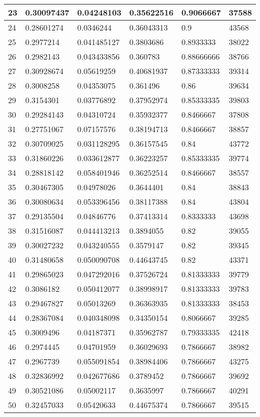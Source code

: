 \begin{longtable}{|l|l|l|l|l|l|}
23 & 0.30097437 & 0.04248103 & 0.35622516 & 0.9066667 & 37588 \\ \hline 
24 & 0.28601274 & 0.0346244 & 0.36043313 & 0.9 & 43568 \\ \hline 
25 & 0.2977214 & 0.041485127 & 0.3803686 & 0.8933333 & 38022 \\ \hline 
26 & 0.2982143 & 0.043433856 & 0.360783 & 0.88666666 & 38766 \\ \hline 
27 & 0.30928674 & 0.05619259 & 0.40681937 & 0.87333333 & 39314 \\ \hline 
28 & 0.3008258 & 0.04353075 & 0.361496 & 0.86 & 39634 \\ \hline 
29 & 0.3154301 & 0.03776892 & 0.37952974 & 0.85333335 & 39803 \\ \hline 
30 & 0.29284143 & 0.04310724 & 0.35932377 & 0.8466667 & 37808 \\ \hline 
31 & 0.27751067 & 0.07157576 & 0.38194713 & 0.8466667 & 38857 \\ \hline 
32 & 0.30709025 & 0.031128295 & 0.36157545 & 0.84 & 43772 \\ \hline 
33 & 0.31860226 & 0.033612877 & 0.36223257 & 0.85333335 & 39774 \\ \hline 
34 & 0.28818142 & 0.058401946 & 0.36252514 & 0.8466667 & 38557 \\ \hline 
35 & 0.30467305 & 0.04978026 & 0.3644401 & 0.84 & 38843 \\ \hline 
36 & 0.30080634 & 0.053396456 & 0.38117388 & 0.84 & 43804 \\ \hline 
37 & 0.29135504 & 0.04846776 & 0.37413314 & 0.8333333 & 43698 \\ \hline 
38 & 0.31516087 & 0.044413213 & 0.3894055 & 0.82 & 39055 \\ \hline 
39 & 0.30027232 & 0.043240555 & 0.3579147 & 0.82 & 39345 \\ \hline 
40 & 0.31480658 & 0.050090708 & 0.44643745 & 0.82 & 43371 \\ \hline 
41 & 0.29865023 & 0.047292016 & 0.37526724 & 0.81333333 & 39779 \\ \hline 
42 & 0.3086182 & 0.050412077 & 0.38998917 & 0.81333333 & 39783 \\ \hline 
43 & 0.29467827 & 0.05013269 & 0.36363935 & 0.81333333 & 38453 \\ \hline 
44 & 0.28367084 & 0.040348098 & 0.34350154 & 0.8066667 & 39285 \\ \hline 
45 & 0.3009496 & 0.04187371 & 0.35962787 & 0.79333335 & 42418 \\ \hline 
46 & 0.2974445 & 0.04701959 & 0.36029693 & 0.7866667 & 38982 \\ \hline 
47 & 0.2967739 & 0.055091854 & 0.38984406 & 0.7866667 & 43275 \\ \hline 
48 & 0.32836992 & 0.042677686 & 0.3789452 & 0.7866667 & 39692 \\ \hline 
49 & 0.30521086 & 0.05002117 & 0.3635997 & 0.7866667 & 40291 \\ \hline 
50 & 0.32457033 & 0.05420633 & 0.44675374 & 0.7866667 & 39515 \\ \hline 
\end{longtable}